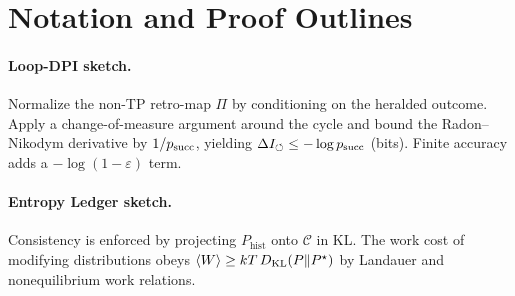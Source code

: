 
\section{Notation and Proof Outlines}
\paragraph{Loop-DPI sketch.} Normalize the non-TP retro-map $\Pi$ by conditioning on the heralded outcome. Apply a change-of-measure argument around the cycle and bound the Radon--Nikodym derivative by $1/p_{\mathrm{succ}}$, yielding $\Delta I_{\circlearrowleft}\le -\log p_{\mathrm{succ}}$ (bits). Finite accuracy adds a $-\log(1-\varepsilon)$ term.

\paragraph{Entropy Ledger sketch.} Consistency is enforced by projecting $P_{\text{hist}}$ onto $\mathcal{C}$ in KL. The work cost of modifying distributions obeys $\langle W\rangle\ge kT\,D_{\mathrm{KL}}(P\Vert P^\star)$ by Landauer and nonequilibrium work relations.
